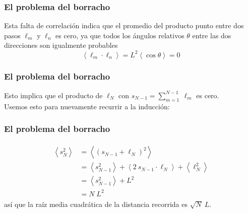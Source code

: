 \begin{frame}
\frametitle{El problema del borracho}
Esta falta de correlación indica que el promedio del producto punto entre dos pasos $\ell_{m}$ y $\ell_{n}$ es cero, ya que todos los ángulos relativos $\theta$ entre las dos direcciones son igualmente probables
\[ \left\langle \ell_{m} \cdot \ell_{n} \right\rangle = L^{2} \left\langle \cos \theta \right\rangle = 0 \]
\end{frame}
\begin{frame}
\frametitle{El problema del borracho}
Esto implica que el producto de $\ell_{N}$ con $s_{N - 1} = \sum_{m = 1}^{N - 1} \: \ell_{m}$ es cero.
\\
\bigskip
Usemos esto para nuevamente recurrir a la inducción:
\end{frame}
\begin{frame}
\frametitle{El problema del borracho}
\begin{align}
\begin{aligned}
\left\langle s_{N}^{2} \right\rangle &= \left\langle (s_{N - 1} + \ell_{N})^{2} \right\rangle \\
&=  \left\langle s_{N -1}^{2} \right\rangle + \left\langle 2 \: s_{N - 1} \cdot \ell_{N} \right\rangle + \left\langle \ell_{N}^{2} \right\rangle \\
&= \left\langle s_{N - 1}^{2} \right\rangle + L^{2} \\
&= N \; L^{2}
\end{aligned}
\label{eq:ecuacion_02_06}
\end{align}
\pause
así que la raíz media cuadrática de la distancia recorrida es $\sqrt{N} \: L$.
\end{frame}
